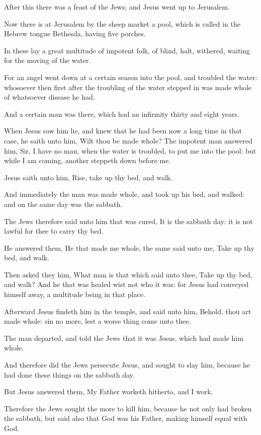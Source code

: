 \Chapter
\Verse After this there was a feast of the Jews; and Jesus went up to Jerusalem.

\Verse Now there is at Jerusalem by the sheep market a pool, which is called in the Hebrew tongue Bethesda, having five porches.

\Verse In these lay a great multitude of impotent folk, of blind, halt, withered, waiting for the moving of the water.

\Verse For an angel went down at a certain season into the pool, and troubled the water: whosoever then first after the troubling of the water stepped in was made whole of whatsoever disease he had.

\Verse And a certain man was there, which had an infirmity thirty and eight years.

\Verse When Jesus saw him lie, and knew that he had been now a long time in that case, he saith unto him, Wilt thou be made whole?  \Verse The impotent man answered him, Sir, I have no man, when the water is troubled, to put me into the pool: but while I am coming, another steppeth down before me.

\Verse Jesus saith unto him, Rise, take up thy bed, and walk.

\Verse And immediately the man was made whole, and took up his bed, and walked: and on the same day was the sabbath.

\Verse The Jews therefore said unto him that was cured, It is the sabbath day: it is not lawful for thee to carry thy bed.

\Verse He answered them, He that made me whole, the same said unto me, Take up thy bed, and walk.

\Verse Then asked they him, What man is that which said unto thee, Take up thy bed, and walk?  \Verse And he that was healed wist not who it was: for Jesus had conveyed himself away, a multitude being in that place.

\Verse Afterward Jesus findeth him in the temple, and said unto him, Behold, thou art made whole: sin no more, lest a worse thing come unto thee.

\Verse The man departed, and told the Jews that it was Jesus, which had made him whole.

\Verse And therefore did the Jews persecute Jesus, and sought to slay him, because he had done these things on the sabbath day.

\Verse But Jesus answered them, My Father worketh hitherto, and I work.

\Verse Therefore the Jews sought the more to kill him, because he not only had broken the sabbath, but said also that God was his Father, making himself equal with God.

